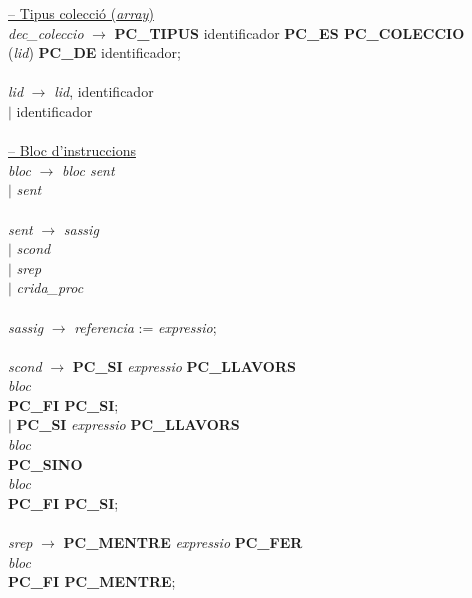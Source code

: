 \begin{tabbing}
        \underline{-- Tipus colecció (\textit{array})} \\
        \textit{dec\_coleccio} \> $\rightarrow$ \> \textbf{PC\_TIPUS} identificador \textbf{PC\_ES PC\_COLECCIO} \\
		\> (\textit{lid}) \textbf{PC\_DE} identificador; \\
        \\
        \textit{lid} \> $\rightarrow$ \> \textit{lid}, identificador \\
        \> $\mid$ \> identificador \\
        \\
        
        
        \underline{-- Bloc d'instruccions} \\
        \textit{bloc} \> $\rightarrow$ \> \textit{bloc sent} \\
        \> $\mid$ \> \textit{sent} \\
        \\
        \textit{sent} \> $\rightarrow$ \> \textit{sassig} \\
        \> $\mid$ \> \textit{scond} \\
        \> $\mid$ \> \textit{srep} \\
        \> $\mid$ \> \textit{crida\_proc} \\
        \\
        
        \textit{sassig} \> $\rightarrow$ \> \textit{referencia} := \textit{expressio}; \\
        \\
        
        \textit{scond} \> $\rightarrow$ \> \textbf{PC\_SI} \textit{expressio} \textbf{PC\_LLAVORS} \\
        \> \> \>  \textit{bloc} \\
        \> \> \textbf{PC\_FI PC\_SI}; \\
        \> $\mid$ \> \textbf{PC\_SI} \textit{expressio} \textbf{PC\_LLAVORS} \\
        \> \> \> \textit{bloc} \\
        \> \> \textbf{PC\_SINO} \\
        \> \> \> \textit{bloc} \\
        \> \> \textbf{PC\_FI PC\_SI}; \\
        \\
        
        \textit{srep} \> $\rightarrow$ \> \textbf{PC\_MENTRE} \textit{expressio} \textbf{PC\_FER} \\
        \> \> \> \textit{bloc} \\
        \> \> \textbf{PC\_FI PC\_MENTRE}; \\
        \\
        

\end{tabbing}
